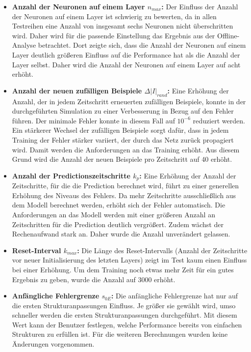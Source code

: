 \begin{itemize}
                    \item \textbf{Anzahl der Neuronen auf einem Layer $n_{max}$:} Der Einfluss der Anzahl der Neuronen auf einem Layer ist schwierig zu bewerten, da in allen 
                    Testreihen eine Anzahl von insgesamt sechs Neuronen nicht überschritten wird. Daher wird für die passende Einstellung das Ergebnis aus der Offline-Analyse betrachtet. 
                    Dort zeigte sich, dass die Anzahl der Neuronen auf einem Layer deutlich größeren Einfluss auf die Performance hat als die Anzahl der Layer selbst. Daher wird die 
                    Anzahl der Neuronen auf einem Layer auf acht erhöht.
                    \item \textbf{Anzahl der neuen zufälligen Beispiele $\Delta|I|_{rand}$:} Eine Erhöhung der Anzahl, der in jedem Zeitschritt erneuerten zufälligen Beispiele, konnte
                    in der durchgeführten Simulation zu einer Verbesserung in Bezug auf den Fehler führen. Der minimale Fehler konnte in diesem Fall auf $10^{-6}$ reduziert werden. 
                    Ein stärkerer Wechsel der zufälligen Beispiele sorgt dafür, dass in jedem Training der Fehler stärker variiert, der durch das Netz zurück propagiert wird. Damit werden die 
                    Anforderungen an das Training erhöht. Aus diesem Grund wird die Anzahl der neuen Beispiele pro Zeitschritt auf 40 erhöht. 
                    \item \textbf{Anzahl der Predictionszeitschritte $k_{p}$:} Eine Erhöhung der Anzahl der Zeitschritte, für die die Prediction berechnet wird, führt zu einer generellen 
                    Erhöhung des Niveaus des Fehlers. Da mehr Zeitschritte ausschließlich aus dem Modell berechnet werden, erhöht sich der Fehler automatisch. Die Anforderungen an 
                    das Modell werden mit einer größeren Anzahl an Zeitschritten für die Prediction deutlich vergrößert. Zudem wächst der Rechenaufwand stark an. Daher wurde die Anzahl 
                    unverändert gelassen. 
                    \item \textbf{Reset-Interval $k_{max}$:} Die Länge des Reset-Intervalls (Anzahl der Zeitschritte vor neuer Initialisierung des letzten Layers) zeigt im Test kaum 
                    einen Einfluss bei einer Erhöhung. Um dem Training noch etwas mehr Zeit für ein gutes Ergebnis zu geben, wurde die Anzahl auf 3000 erhöht.
                    \item \textbf{Anfängliche Fehlergrenze $s_{0E}$:} Die anfängliche Fehlergrenze hat nur auf die ersten Strukturanpassungen Einfluss. Je größer sie gewählt wird, umso 
                    schneller werden die ersten Strukturanpassungen durchgeführt. Mit diesem Wert kann der Benutzer festlegen, welche Performance bereits von einfachen Strukturen zu 
                    erfüllen ist. Für die weiteren Berechnungen wurden keine Änderungen vorgenommen.
                 \end{itemize}
                 
